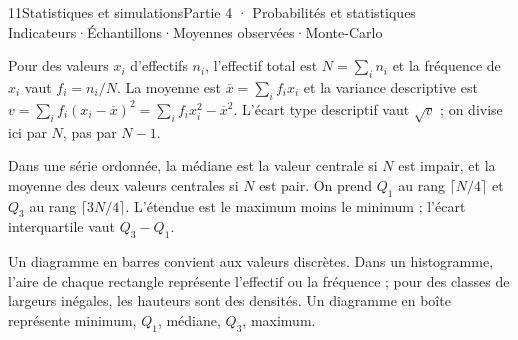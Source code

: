 \begin{ouverture}[grandsnombres]{11}{Statistiques et simulations}{Partie 4 · Probabilités et statistiques}
{Indicateurs\enspace·\enspace Échantillons\enspace·\enspace Moyennes observées\enspace·\enspace Monte-Carlo}
\end{ouverture}
\essentiel
{}
\begin{definition}
Pour des valeurs $x_i$ d'effectifs $n_i$, l'effectif total est $N=\sum_i n_i$
et la fréquence de $x_i$ vaut $f_i=n_i/N$.
La moyenne est $\overline x=\sum_i f_ix_i$ et la variance descriptive est
$v=\sum_i f_i(x_i-\overline x)^2=\sum_i f_ix_i^2-\overline x^2$.
L'écart type descriptif vaut $\sqrt v$ ; on divise ici par $N$, pas par $N-1$.
\end{definition}
\begin{propriete}
Dans une série ordonnée, la médiane est la valeur centrale si $N$ est impair,
et la moyenne des deux valeurs centrales si $N$ est pair.
On prend $Q_1$ au rang $\lceil N/4\rceil$ et $Q_3$ au rang $\lceil3N/4\rceil$.
L'étendue est le maximum moins le minimum ; l'écart interquartile vaut $Q_3-Q_1$.
\end{propriete}
\begin{savoirfaire}
Un diagramme en barres convient aux valeurs discrètes. Dans un histogramme,
l'aire de chaque rectangle représente l'effectif ou la fréquence ; pour des
classes de largeurs inégales, les hauteurs sont des densités.
Un diagramme en boîte représente minimum, $Q_1$, médiane, $Q_3$, maximum.
\end{savoirfaire}
\begin{center}
\par{}
\end{center}

